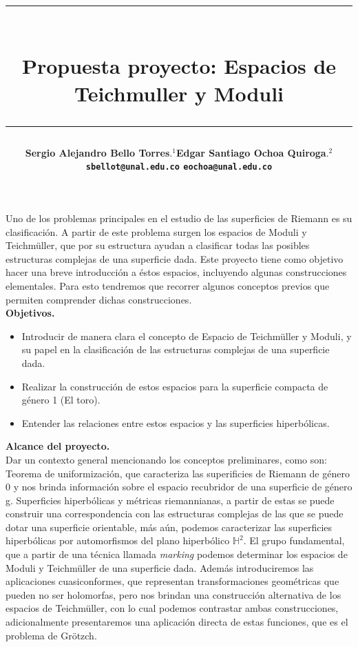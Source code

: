 \documentclass[12pt]{article}
\title{\vspace{-2cm}\par\noindent\rule{16cm}{1pt}\large
\\\bfseries Propuesta proyecto: Espacios de Teichmuller y Moduli
\vspace{-0.34cm}\par\noindent\hspace{0.15cm}\rule{16cm}{1pt}
\vspace{-0.6cm}
}
\author{\small \bfseries Sergio Alejandro Bello Torres$.^{1}$\quad \quad\small Edgar Santiago Ochoa Quiroga$.^{2}$\\ \small \quad \texttt{sbellot@unal.edu.co} \quad \quad \quad \quad \quad \quad \texttt{eochoa@unal.edu.co}\quad\quad \quad\\}
\begin{document}
\maketitle

Uno de los problemas principales en el estudio de las superficies de Riemann es su clasificación. A partir de este problema surgen los espacios de Moduli y Teichmüller, que por su estructura ayudan a clasificar todas las posibles estructuras complejas de una superficie dada. Este proyecto tiene como objetivo hacer una breve introducción a éstos espacios, incluyendo algunas construcciones elementales. Para esto tendremos que recorrer algunos conceptos previos que permiten comprender dichas construcciones.\\

\textbf{Objetivos.}
\begin{itemize}
    \item Introducir de manera clara el concepto de Espacio de Teichmüller y Moduli, y su papel en la clasificación de las estructuras complejas de una superficie dada.
    \item Realizar la construcción de estos espacios para la superficie compacta de género 1 (El toro).
    \item Entender las relaciones entre estos espacios y las superficies hiperbólicas.
\end{itemize}

\textbf{Alcance del proyecto.}\\
    
    Dar un contexto general mencionando los conceptos preliminares, como son: Teorema de uniformización, que caracteriza las superificies de Riemann de género 0 y nos brinda información sobre el espacio recubridor de una superficie de género g. Superficies hiperbólicas y métricas riemannianas, a partir de estas se puede construir una correspondencia con las estructuras complejas de las que se puede dotar una superficie orientable, más aún, podemos caracterizar las superficies hiperbólicas por automorfismos del plano hiperbólico $\mathbb{H}^2$. El grupo fundamental, que a partir de una técnica llamada \textit{marking} podemos determinar los espacios de Moduli y Teichmüller de una superficie dada. Además introduciremos las aplicaciones cuasiconformes, que representan transformaciones geométricas que pueden no ser holomorfas, pero nos brindan una construcción alternativa de los espacios de Teichmüller, con lo cual podemos contrastar ambas construcciones, adicionalmente presentaremos una aplicación directa de estas funciones, que es el problema de Grötzch.\\
\end{document}
